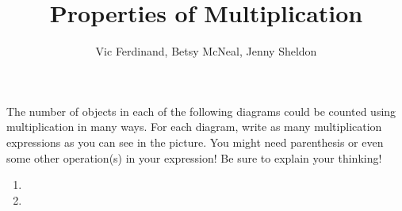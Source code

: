 \documentclass[nooutcomes,noauthor,handout]{ximera}
\title{Properties of Multiplication}
\author{Vic Ferdinand, Betsy McNeal, Jenny Sheldon}
\begin{document}
\begin{abstract} \end{abstract}
\maketitle



\begin{problem}

 The number of objects in each of the following diagrams could be counted using multiplication in many ways.  For each diagram, write as many multiplication expressions as you can see in the picture.  You might need parenthesis or even some other operation(s) in your expression!  Be sure to explain your thinking!
\begin{enumerate}
    \setlength\itemsep{1cm}
    \item \leavevmode\vadjust{\vspace{-\baselineskip}}
    \item \leavevmode\vadjust{\vspace{-\baselineskip}}
\end{enumerate}
\end{problem}
\end{document}
